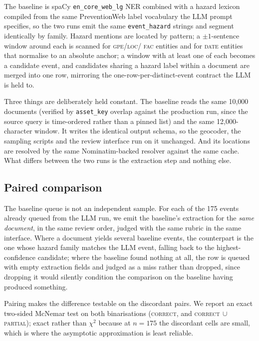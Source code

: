 The baseline is spaCy \texttt{en\_core\_web\_lg} NER combined with a hazard
lexicon compiled from the same PreventionWeb label vocabulary the LLM prompt
specifies, so the two runs emit the same \texttt{event\_hazard} strings and
segment identically by family. Hazard mentions are located by pattern; a
$\pm 1$-sentence window around each is scanned for \textsc{gpe}/\textsc{loc}/
\textsc{fac} entities and for \textsc{date} entities that normalise to an
absolute anchor; a window with at least one of each becomes a candidate event,
and candidates sharing a hazard label within a document are merged into one
row, mirroring the one-row-per-distinct-event contract the LLM is held to.

Three things are deliberately held constant. The baseline reads the same
10{,}000 documents (verified by \texttt{asset\_key} overlap against the
production run, since the source query is time-ordered rather than a pinned
list) and the same 12{,}000-character window. It writes the identical output
schema, so the geocoder, the sampling scripts and the review interface run on
it unchanged. And its locations are resolved by the same Nominatim-backed
resolver against the same cache. What differs between the two runs is the
extraction step and nothing else.

\subsection{Paired comparison}
\label{ssec:paired}

The baseline queue is not an independent sample. For each of the 175 events
already queued from the LLM run, we emit the baseline's extraction for the
\emph{same document}, in the same review order, judged with the same rubric in
the same interface. Where a document yields several baseline events, the
counterpart is the one whose hazard family matches the LLM event, falling back
to the highest-confidence candidate; where the baseline found nothing at all,
the row is queued with empty extraction fields and judged as a miss rather than
dropped, since dropping it would silently condition the comparison on the
baseline having produced something.

Pairing makes the difference testable on the discordant pairs. We report an
exact two-sided McNemar test on both binarisations (\textsc{correct}, and
\textsc{correct}$\,\cup\,$\textsc{partial}); exact rather than $\chi^2$ because
at $n=175$ the discordant cells are small, which is where the asymptotic
approximation is least reliable.

